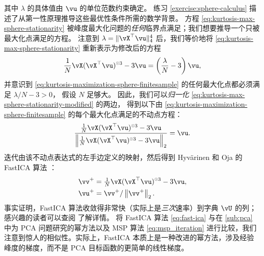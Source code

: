 \documentclass[../../book-main_zh.tex]{subfiles}
\begin{document}
其中 $\lambda$ 的具体值由 $\vu$ 的单位范数约束确定。
练习 \ref{exercise:sphere-calculus} 描述了从第一性原理推导这些最优性条件所需的数学背景。
方程 \eqref{eq:kurtosis-max-sphere-stationarity} 被峰度最大化问题的\textit{任何}临界点满足；我们想要推导一个只被最大化点满足的方程。
注意到 $\lambda = \norm{\vX^\top \vu}_4^4$ 后，我们等价地将 \eqref{eq:kurtosis-max-sphere-stationarity} 重新表示为修改后的方程
\begin{align}\label{eq:kurtosis-max-sphere-stationarity-modified}
   \frac{1}{N}\vX (\vX^\top \vu)^{\hada 3} 
   - 
   3 \vu
   = 
   \left(
   \frac{\lambda}{N} - 3
   \right)
   \vu,
\end{align}
并意识到 \eqref{eq:kurtosis-maximization-sphere-finitesample} 的任何最大化点都必须满足 $\lambda / N - 3 > 0$，
假设 $N$ 足够大。
因此，我们可以\textit{归一化} \eqref{eq:kurtosis-max-sphere-stationarity-modified} 的两边，
得到以下由 \eqref{eq:kurtosis-maximization-sphere-finitesample} 的每个最大化点满足的不动点方程：
\begin{align}\label{eq:kurtosis-max-sphere-fxp}
\frac{
   \frac{1}{N}\vX (\vX^\top \vu)^{\hada 3} 
   - 
   3 \vu
   }{
   \norm*{
   \frac{1}{N}\vX (\vX^\top \vu)^{\hada 3} 
   - 
   3 \vu
   }_2
   }
   =
   \vu.
\end{align}
迭代由该不动点表达式的左手边定义的映射，然后得到 Hyvärinen 和 Oja 的 FastICA 算法 \cite{hyvarinen-1997}：
\begin{equation}
\begin{split}\label{eq:fast-ica}
   \vv^+ &= \tfrac{1}{N}\vX (\vX^\top \vu)^{\hada 3}- 3 \vu
   ,  \\
   \vu^+ &= \vv^+ / \norm*{\vv^+}_2.
   \end{split}
\end{equation}
事实证明，FastICA 算法收敛得非常快（实际上是\textit{三次}速率）到字典 $\vU$ 的列；感兴趣的读者可以查阅 \cite{hyvarinen-1997} 了解详情。
将 FastICA 算法 \eqref{eq:fast-ica} 与在 \ref{sub:pca} 中为 PCA 问题研究的幂方法以及 MSP 算法 \eqref{eq:msp_iteration} 进行比较，我们注意到惊人的相似性。实际上，FastICA 本质上是一种改进的幂方法，涉及经验峰度的梯度，而不是 PCA 目标函数的更简单的线性梯度。

\end{document}
